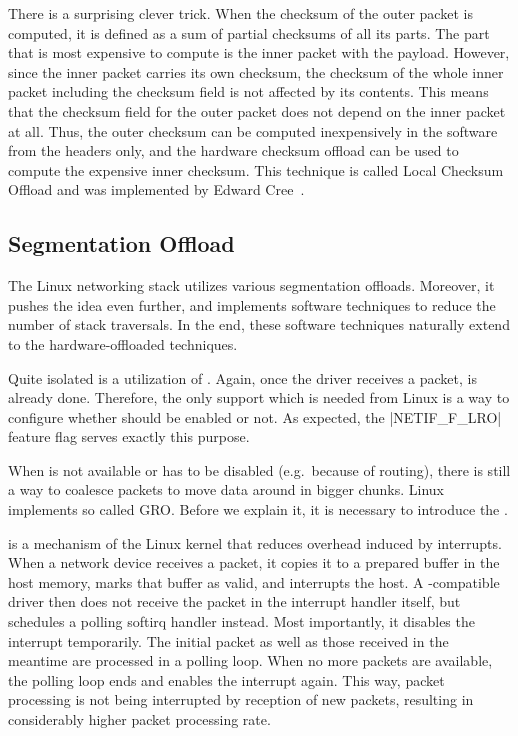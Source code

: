 There is a surprising clever trick. When the checksum of the outer packet is
computed, it is defined as a sum of partial checksums of all its parts. The
part that is most expensive to compute is the inner  packet with the payload.
However, since the inner packet carries its own checksum, the checksum of the
whole inner packet including the checksum field is not affected by its
contents. This means that the checksum field for the outer packet does not
depend on the inner  packet at all. Thus, the outer checksum can be
computed inexpensively in the software from the headers only, and the hardware
checksum offload can be used to compute the expensive inner checksum. This
technique is called Local Checksum Offload and was implemented by Edward
Cree~\cite{linux-lco}.

\subsection{Segmentation Offload}

The Linux networking stack utilizes various segmentation offloads.
Moreover, it pushes the idea even further, and implements software techniques
to reduce the number of stack traversals. In the end, these software techniques
naturally extend to the hardware-offloaded techniques.

Quite isolated is a utilization of . Again, once the driver
receives a packet,  is already done. Therefore, the only support which is
needed from Linux is a way to configure whether  should be enabled or
not. As expected, the \macro|NETIF_F_LRO| feature flag serves exactly this
purpose.

When  is not available or has to be disabled (e.g.\ because of routing),
there is still a way to coalesce packets to move data around in bigger chunks.
Linux implements so called \acrfull{GRO}. Before we explain it, it is necessary
to introduce the .

 is a mechanism of the Linux kernel that reduces overhead induced by interrupts. When
a network device receives a packet, it copies it to a prepared 
buffer in the host memory, marks that buffer as valid, and interrupts the host.
A -compatible driver then does not receive the packet in the interrupt
handler itself, but schedules a polling softirq handler instead. Most
importantly, it disables the interrupt temporarily. The initial packet as well
as those received in the meantime are processed in a polling
loop. When no more packets are available, the polling loop ends and enables the
interrupt again. This way, packet processing is not being interrupted by
reception of new packets, resulting in considerably higher packet processing
rate.


